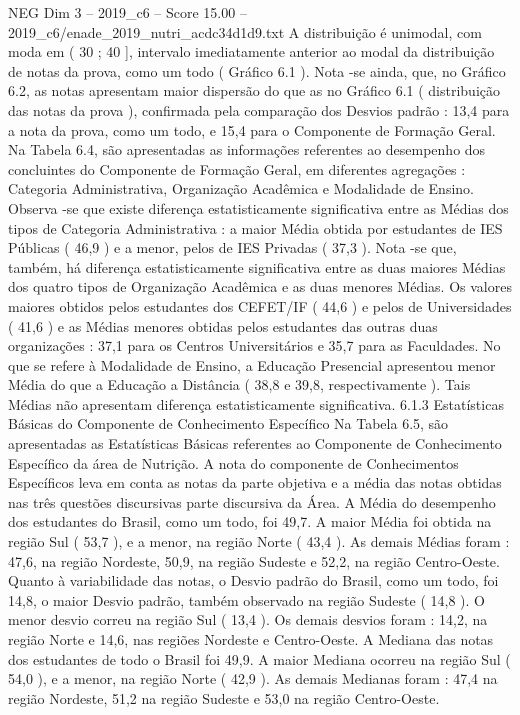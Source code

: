 \begin{textsample}{NEG Dim 3 – 2019\_c6 – Score 15.00 – 2019\_c6/enade\_2019\_nutri\_acdc34d1d9.txt}
A distribuição é unimodal, com moda em ( 30 ; 40 ], intervalo imediatamente anterior ao modal da distribuição de notas da prova, como um todo ( Gráfico 6.1 ).
Nota -se ainda, que, no Gráfico 6.2, as notas apresentam maior dispersão do que as no Gráfico 6.1 ( distribuição das notas da prova ), confirmada pela comparação dos Desvios padrão : 13,4 para a nota da prova, como um todo, e 15,4 para o Componente de Formação Geral.
Na Tabela 6.4, são apresentadas as informações referentes ao desempenho dos concluintes do Componente de Formação Geral, em diferentes agregações : Categoria Administrativa, Organização Acadêmica e Modalidade de Ensino.
Observa -se que existe diferença estatisticamente significativa entre as Médias dos tipos de Categoria Administrativa : a maior Média obtida por estudantes de IES Públicas ( 46,9 ) e a menor, pelos de IES Privadas ( 37,3 ).
Nota -se que, também, há diferença estatisticamente significativa entre as duas maiores Médias dos quatro tipos de Organização Acadêmica e as duas menores Médias.
Os valores maiores obtidos pelos estudantes dos CEFET/IF ( 44,6 ) e pelos de Universidades ( 41,6 ) e as Médias menores obtidas pelos estudantes das outras duas organizações : 37,1 para os Centros Universitários e 35,7 para as Faculdades.
No que se refere à Modalidade de Ensino, a Educação Presencial apresentou menor Média do que a Educação a Distância ( 38,8 e 39,8, respectivamente ).
Tais Médias não apresentam diferença estatisticamente significativa. 6.1.3 Estatísticas Básicas do Componente de Conhecimento Específico Na Tabela 6.5, são apresentadas as Estatísticas Básicas referentes ao Componente de Conhecimento Específico da área de Nutrição.
A nota do componente de Conhecimentos Específicos leva em conta as notas da parte objetiva e a média das notas obtidas nas três questões discursivas parte discursiva da Área.
A Média do desempenho dos estudantes do Brasil, como um todo, foi 49,7.
A maior Média foi obtida na região Sul ( 53,7 ), e a menor, na região Norte ( 43,4 ).
As demais Médias foram : 47,6, na região Nordeste, 50,9, na região Sudeste e 52,2, na região Centro-Oeste.
Quanto à variabilidade das notas, o Desvio padrão do Brasil, como um todo, foi 14,8, o maior Desvio padrão, também observado na região Sudeste ( 14,8 ).
O menor desvio correu na região Sul ( 13,4 ).
Os demais desvios foram : 14,2, na região Norte e 14,6, nas regiões Nordeste e Centro-Oeste.
A Mediana das notas dos estudantes de todo o Brasil foi 49,9.
A maior Mediana ocorreu na região Sul ( 54,0 ), e a menor, na região Norte ( 42,9 ).
As demais Medianas foram : 47,4 na região Nordeste, 51,2 na região Sudeste e 53,0 na região Centro-Oeste.

\end{textsample}
